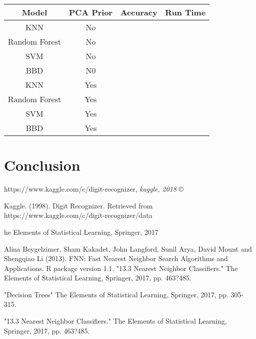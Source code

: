 \documentclass[11pt, oneside]{article}   	%
\begin{document}
\begin{center}
\begin{tabular}{ |c|c|c|c| } 
\hline
Model & PCA Prior & Accuracy & Run Time\\
 \hline \hline
  KNN & No &  & \\ 
Random Forest & No &  & \\ 
 SVM & No &  & \\ 
 BBD & N0 &  & \\
 \hline
 KNN & Yes &  & \\ 
Random Forest & Yes &  & \\ 
 SVM & Yes &  & \\ 
 BBD & Yes &  & \\
 \hline
\end{tabular}
\end{center}

\section{Conclusion}


\begin{thebibliography}{9}

https://www.kaggle.com/c/digit-recognizer, \textit{kaggle, 2018} \copyright
 
Kaggle. (1998). Digit Recognizer. Retrieved from https://www.kaggle.com/c/digit-recognizer/data 

he Elements of Statistical Learning, Springer, 2017

Alina Beygelzimer, Sham Kakadet, John Langford, Sunil Arya, David Mount and Shengqiao
  Li (2013). FNN: Fast Nearest Neighbor Search Algorithms and Applications. R package
  version 1.1.
"13.3 Nearest Neighbor Classifiers." The Elements of Statistical Learning, Springer, 2017, pp. 463?485. 

"Decision Trees" The Elements of Statistical Learning, Springer, 2017, pp. 305-315.

"13.3 Nearest Neighbor Classifiers." The Elements of Statistical Learning, Springer, 2017, pp. 463?485.
 
\end{thebibliography}
\end{document}

